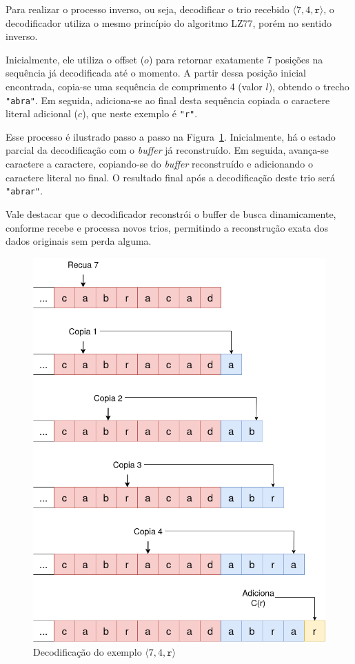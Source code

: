 Para realizar o processo inverso, ou seja, decodificar o trio recebido $\langle 7, 4, \texttt{r} \rangle$, o decodificador utiliza o mesmo princípio do algoritmo LZ77, porém no sentido inverso.

Inicialmente, ele utiliza o offset ($o$) para retornar exatamente 7 posições na sequência já decodificada até o momento. A partir dessa posição inicial encontrada, copia-se uma sequência de comprimento 4 (valor $l$), obtendo o trecho \texttt{"abra"}. Em seguida, adiciona-se ao final desta sequência copiada o caractere literal adicional ($c$), que neste exemplo é \texttt{"r"}.

Esse processo é ilustrado passo a passo na Figura~\ref{fig:Estado_deconding}. Inicialmente, há o estado parcial da decodificação com o \textit{buffer} já reconstruído. Em seguida, avança-se caractere a caractere, copiando-se do \textit{buffer} reconstruído e adicionando o caractere literal no final. O resultado final após a decodificação deste trio será \texttt{"abrar"}.

Vale destacar que o decodificador reconstrói o buffer de busca dinamicamente, conforme recebe e processa novos trios, permitindo a reconstrução exata dos dados originais sem perda alguma.


\begin{figure}[ht]
\centering
\caption{Decodificação do exemplo $\langle 7, 4, \texttt{r} \rangle$ }
\label{fig:Estado_deconding}
\includegraphics[width=12cm]{figuras/DiagramasTCC-LZ77-Decoding}
\end{figure}

